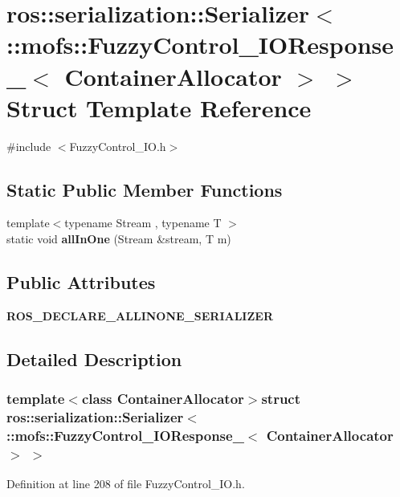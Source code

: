 \section{ros\-:\-:serialization\-:\-:Serializer$<$ \-:\-:mofs\-:\-:Fuzzy\-Control\-\_\-\-I\-O\-Response\-\_\-$<$ Container\-Allocator $>$ $>$ Struct Template Reference}
\label{structros_1_1serialization_1_1Serializer_3_01_1_1mofs_1_1FuzzyControl__IOResponse___3_01ContainerAllocator_01_4_01_4}


{\ttfamily \#include $<$Fuzzy\-Control\-\_\-\-I\-O.\-h$>$}

\subsection*{Static Public Member Functions}
\begin{DoxyCompactItemize}
\item 
{\footnotesize template$<$typename Stream , typename T $>$ }\\static void {\bf all\-In\-One} (Stream \&stream, T m)
\end{DoxyCompactItemize}
\subsection*{Public Attributes}
\begin{DoxyCompactItemize}
\item 
{\bf R\-O\-S\-\_\-\-D\-E\-C\-L\-A\-R\-E\-\_\-\-A\-L\-L\-I\-N\-O\-N\-E\-\_\-\-S\-E\-R\-I\-A\-L\-I\-Z\-E\-R}
\end{DoxyCompactItemize}


\subsection{Detailed Description}
\subsubsection*{template$<$class Container\-Allocator$>$struct ros\-::serialization\-::\-Serializer$<$ \-::mofs\-::\-Fuzzy\-Control\-\_\-\-I\-O\-Response\-\_\-$<$ Container\-Allocator $>$ $>$}



Definition at line 208 of file Fuzzy\-Control\-\_\-\-I\-O.\-h.



